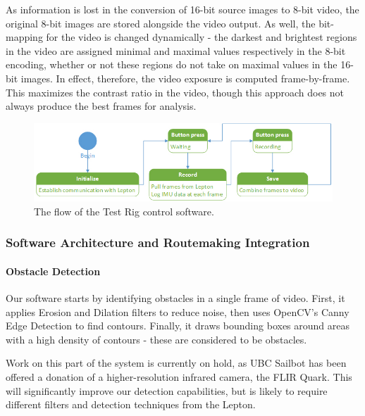 As information is lost in the conversion of 16-bit source images to 8-bit video, the original 8-bit images are stored alongside the video output. As well, the bit-mapping for the video is changed dynamically - the darkest and brightest regions in the video are assigned minimal and maximal values respectively in the 8-bit encoding, whether or not these regions do not take on maximal values in the 16-bit images. In effect, therefore, the video exposure is computed frame-by-frame. This maximizes the contrast ratio in the video, though this approach does not always produce the best frames for analysis.

\begin{figure}[h]
\centering
\includegraphics[width=\linewidth]{"./image/button_py"}
\caption[Test Rig software flow]{\label{fig:test-rig-software}The flow of the Test Rig control software.}
\end{figure}

\subsubsection{\label{sec:discussion:equipment:architecture}Software Architecture and Routemaking Integration}

\paragraph{\label{sec:discussion:equipment:architecture:obstacledetection}Obstacle Detection}
Our software starts by identifying obstacles in a single frame of video.  First, it applies Erosion and Dilation filters to reduce noise, then uses OpenCV's Canny Edge Detection to find contours.  Finally, it draws bounding boxes around areas with a high density of contours - these are considered to be obstacles.

Work on this part of the system is currently on hold, as UBC Sailbot has been offered a donation of a higher-resolution infrared camera, the FLIR Quark.  This will significantly improve our detection capabilities, but is likely to require different filters and detection techniques from the Lepton.

